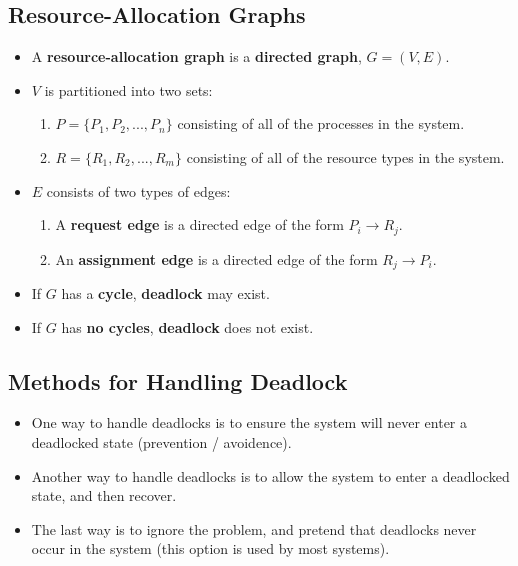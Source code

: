 \documentclass{article}
\begin{document}
    \subsection*{Resource-Allocation Graphs}
    \begin{itemize}
        \item A \textbf{resource-allocation graph} is a \textbf{directed graph}, $G=(V,E)$.
        \item $V$ is partitioned into two sets:
        \begin{enumerate}
            \item $P=\{P_1, P_2, ..., P_n\}$ consisting of all of the processes in the system.
            \item $R=\{R_1, R_2, ..., R_m\}$ consisting of all of the resource types in the system.
        \end{enumerate}
        \item $E$ consists of two types of edges:
        \begin{enumerate}
            \item A \textbf{request edge} is a directed edge of the form $P_i \rightarrow R_j$.
            \item An \textbf{assignment edge} is a directed edge of the form $R_j \rightarrow P_i$.
        \end{enumerate}
        \item If $G$ has a \textbf{cycle}, \textbf{deadlock} may exist.
        \item If $G$ has \textbf{no cycles}, \textbf{deadlock} does not exist.
    \end{itemize}

    \subsection*{Methods for Handling Deadlock}
    \begin{itemize}
        \item One way to handle deadlocks is to ensure the system will never enter a deadlocked state (prevention / avoidence).
        \item Another way to handle deadlocks is to allow the system to enter a deadlocked state, and then recover.
        \item The last way is to ignore the problem, and pretend that deadlocks never occur in the system (this option is used by most systems).
    \end{itemize}
\end{document}
